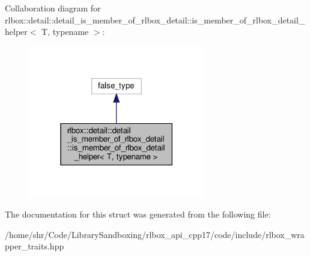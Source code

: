 Collaboration diagram for rlbox\+:\+:detail\+:\+:detail\+\_\+is\+\_\+member\+\_\+of\+\_\+rlbox\+\_\+detail\+:\+:is\+\_\+member\+\_\+of\+\_\+rlbox\+\_\+detail\+\_\+helper$<$ T, typename $>$\+:
\nopagebreak
\begin{figure}[H]
\begin{center}
\leavevmode
\includegraphics[width=219pt]{structrlbox_1_1detail_1_1detail__is__member__of__rlbox__detail_1_1is__member__of__rlbox__detail__helper__coll__graph}
\end{center}
\end{figure}


The documentation for this struct was generated from the following file\+:\begin{DoxyCompactItemize}
\item 
/home/shr/\+Code/\+Library\+Sandboxing/rlbox\+\_\+api\+\_\+cpp17/code/include/rlbox\+\_\+wrapper\+\_\+traits.\+hpp\end{DoxyCompactItemize}
